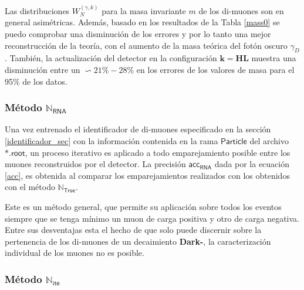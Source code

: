Las distribuciones $W_N^{(\gamma,k)}$ para la masa invariante $m$ de los di-muones son en general asimétricas. Además, basado en los resultados de la Tabla \ref{mass0} se puedo comprobar una disminución de los errores y por lo tanto una mejor reconstrucción de la teoría, con el aumento de la masa teórica del fotón oscuro $\gamma_D$. También, la actualización del detector en la configuración $\mathbf{k = HL}$ muestra una disminución entre un $\backsim 21\%-28\%$ en los errores de los valores de masa para el 95\% de los datos. 



\subsubsection{Método $\mathbb{N}_\textsf{RNA}$}
Una vez entrenado el identificador de di-muones especificado en la sección \ref{identificador_sec} con la información contenida en la rama $\textsf{Particle}$ del archivo $\textsf{*.root}$, un proceso iterativo es aplicado a todo emparejamiento posible entre los muones reconstruidos por el detector. La precisión $\textsf{acc}_\textsf{RNA}$ dada por la ecuación \ref{acc}, es obtenida al comparar los emparejamientos realizados con los obtenidos con el método $\mathbb{N}_\textsf{True}$.

Este es un método general, que permite su aplicación sobre todos los eventos siempre que se tenga mínimo un muon de carga positiva y otro de carga negativa. %
Entre sus desventajas esta el hecho de que solo puede discernir sobre la pertenencia de los di-muones de un decaimiento \textbf{Dark-}\SUSY, la caracterización individual de los muones no es posible.


\subsubsection{Método $\mathbb{N}_\textsf{ite}$}
 
